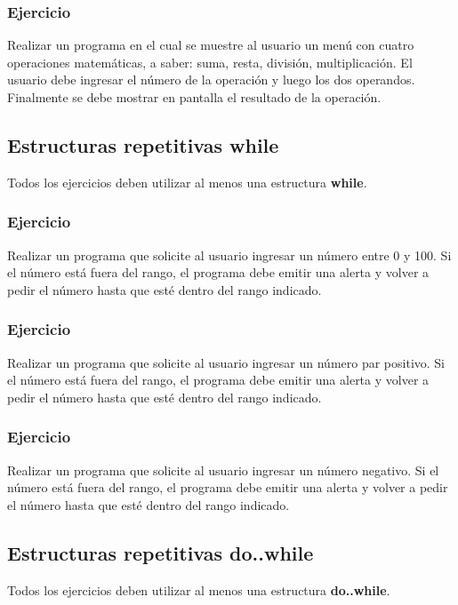 \subsubsection{Ejercicio}
Realizar un programa en el cual se muestre al usuario un menú con cuatro operaciones matemáticas, a saber: suma, resta, división, multiplicación. El usuario debe ingresar el número de la operación y luego los dos operandos. Finalmente se debe mostrar en pantalla el resultado de la operación.

\subsection*{Estructuras repetitivas while}
Todos los ejercicios deben utilizar al menos una estructura \textbf{while}.
\subsubsection{Ejercicio}
Realizar un programa que solicite al usuario ingresar un número entre 0 y 100. Si el número está fuera del rango, el programa debe emitir una alerta y volver a pedir el número hasta que esté dentro del rango indicado.


\subsubsection{Ejercicio}
Realizar un programa que solicite al usuario ingresar un número par positivo. Si el número está fuera del rango, el programa debe emitir una alerta y volver a pedir el número hasta que esté dentro del rango indicado.


\subsubsection{Ejercicio}
Realizar un programa que solicite al usuario ingresar un número negativo. Si el número está fuera del rango, el programa debe emitir una alerta y volver a pedir el número hasta que esté dentro del rango indicado.

\subsection*{Estructuras repetitivas do..while}
Todos los ejercicios deben utilizar al menos una estructura \textbf{do..while}.
